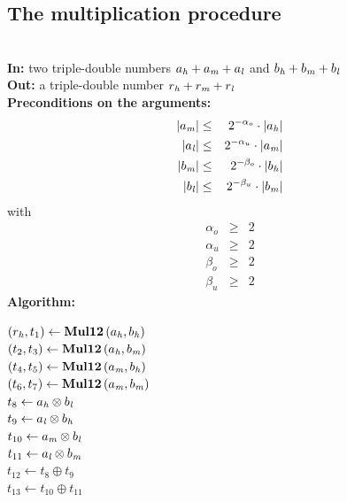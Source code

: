 \subsection{The multiplication procedure \MulTT}
\begin{algorithm}[\MulTT] \label{mulTTref} ~ \\
{\bf In:} two triple-double numbers $a_{\mathit{h}} + a_{\mathit{m}} + a_{\mathit{l}}$ and $b_{\mathit{h}} + b_{\mathit{m}} + b_{\mathit{l}}$ \\
{\bf Out:} a triple-double number $r_{\mathit{h}} + r_{\mathit{m}} + r_{\mathit{l}}$ \\
{\bf Preconditions on the arguments:}
\begin{eqnarray*}
\left \vert a_{\mathit{m}} \right \vert & \leq & 2^{-\alpha_o} \cdot \left \vert a_{\mathit{h}} \right \vert \\
\left \vert a_{\mathit{l}} \right \vert & \leq & 2^{-\alpha_u} \cdot \left \vert a_{\mathit{m}} \right \vert \\
\left \vert b_{\mathit{m}} \right \vert & \leq & 2^{-\beta_o} \cdot \left \vert b_{\mathit{h}} \right \vert \\
\left \vert b_{\mathit{l}} \right \vert & \leq & 2^{-\beta_u} \cdot \left \vert b_{\mathit{m}} \right \vert 
\end{eqnarray*}
with
\begin{eqnarray*}
\alpha_o & \geq & 2 \\
\alpha_u & \geq & 2 \\
\beta_o & \geq & 2 \\
\beta_u & \geq & 2 
\end{eqnarray*}
{\bf Algorithm:} \\
\begin{center}
\begin{minipage}[b]{60mm}
$\left( r_{\mathit{h}}, t_1 \right) \gets \mathbf{Mul12}\left( a_{\mathit{h}}, b_{\mathit{h}} \right)$ \\
$\left( t_2, t_3 \right) \gets \mathbf{Mul12}\left( a_{\mathit{h}}, b_{\mathit{m}} \right)$ \\
$\left( t_4, t_5 \right) \gets \mathbf{Mul12}\left( a_{\mathit{m}}, b_{\mathit{h}} \right)$ \\
$\left( t_6, t_7 \right) \gets \mathbf{Mul12}\left( a_{\mathit{m}}, b_{\mathit{m}} \right)$ \\
$t_8 \gets a_{\mathit{h}} \otimes b_{\mathit{l}}$ \\
$t_9 \gets a_{\mathit{l}} \otimes b_{\mathit{h}}$ \\
$t_{10} \gets a_{\mathit{m}} \otimes b_{\mathit{l}}$ \\
$t_{11} \gets a_{\mathit{l}} \otimes b_{\mathit{m}}$ \\
$t_{12} \gets t_8 \oplus t_9$ \\
$t_{13} \gets t_{10} \oplus t_{11}$ \\

\end{minipage}
\end{center}
\end{algorithm}
